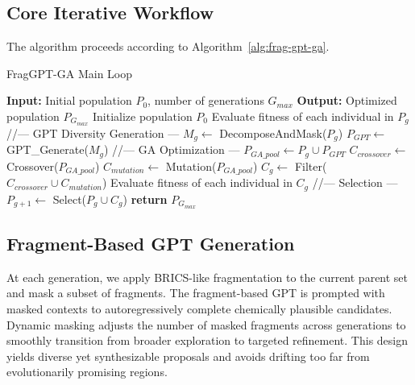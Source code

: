 \documentclass[lettersize,journal]{IEEEtran}
\begin{document}
\subsection{Core Iterative Workflow}
The algorithm proceeds according to Algorithm~\ref{alg:frag-gpt-ga}.
\begin{algorithm}[H]
\caption{FragGPT-GA Main Loop}
\label{alg:frag-gpt-ga}
\begin{algorithmic}
\STATE \textbf{Input:} Initial population $P_0$, number of generations $G_{max}$
\STATE \textbf{Output:} Optimized population $P_{G_{max}}$
\STATE Initialize population $P_0$
    \STATE Evaluate fitness of each individual in $P_g$
    \STATE //--- GPT Diversity Generation ---
    \STATE $M_g \leftarrow$ DecomposeAndMask($P_g$)
    \STATE $P_{GPT} \leftarrow$ GPT\_Generate($M_g$)
    \STATE //--- GA Optimization ---
    \STATE $P_{GA\_pool} \leftarrow P_g \cup P_{GPT}$
    \STATE $C_{crossover} \leftarrow$ Crossover($P_{GA\_pool}$)
    \STATE $C_{mutation} \leftarrow$ Mutation($P_{GA\_pool}$)
    \STATE $C_g \leftarrow$ Filter($C_{crossover} \cup C_{mutation}$)
    \STATE Evaluate fitness of each individual in $C_g$
    \STATE //--- Selection ---
    \STATE $P_{g+1} \leftarrow$ Select($P_g \cup C_g$)
\ENDFOR
\STATE \textbf{return} $P_{G_{max}}$
\end{algorithmic}
\end{algorithm}

\subsection{Fragment-Based GPT Generation}
At each generation, we apply BRICS-like fragmentation to the current parent set and mask a subset of fragments. The fragment-based GPT is prompted with masked contexts to autoregressively complete chemically plausible candidates. Dynamic masking adjusts the number of masked fragments across generations to smoothly transition from broader exploration to targeted refinement. This design yields diverse yet synthesizable proposals and avoids drifting too far from evolutionarily promising regions.
\end{document}
